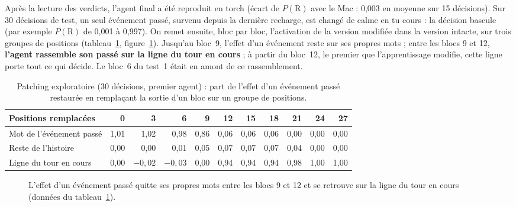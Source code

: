 \documentclass[11pt,a4paper]{article}
\begin{document}
Après la lecture des verdicts, l'agent final a été reproduit en torch (écart de
$P(\mathrm R)$ avec le Mac : 0,003 en moyenne sur 15 décisions). Sur 30 décisions
de test, un seul événement passé, survenu depuis la dernière recharge, est changé
de \og calme \fg{} en \og tu cours \fg{} : la décision bascule (par exemple
$P(\mathrm R)$ de 0,001 à 0,997). On remet ensuite, bloc par bloc, l'activation de
la version modifiée dans la version intacte, sur trois groupes de positions
(tableau~\ref{tab-patch}, figure~\ref{fig-patch}). Jusqu'au bloc~9, l'effet d'un
événement reste sur ses propres mots ; entre les blocs 9 et 12,
\textbf{l'agent rassemble son passé sur la ligne du tour en cours} ; à partir du
bloc~12, le premier que l'apprentissage modifie, cette ligne porte tout ce qui
décide. Le bloc~6 du test~1 était en amont de ce rassemblement.

\begin{table}[t]
\centering
\caption{Patching exploratoire (30 décisions, premier agent) : part de l'effet
d'un événement passé restaurée en remplaçant la sortie d'un bloc sur un groupe de
positions.}
\label{tab-patch}
\small
\setlength{\tabcolsep}{4.5pt}
\begin{tabular}{@{}l rrrrrrrrrr@{}}
\toprule
Positions remplacées & 0 & 3 & 6 & 9 & 12 & 15 & 18 & 21 & 24 & 27 \\
\midrule
Mot de l'événement passé & 1,01 & 1,02 & 0,98 & 0,86 & 0,06 & 0,06 & 0,06 & 0,00 & 0,00 & 0,00 \\
Reste de l'histoire & 0,00 & 0,00 & 0,01 & 0,05 & 0,07 & 0,07 & 0,07 & 0,04 & 0,00 & 0,00 \\
Ligne du tour en cours & 0,00 & $-0,02$ & $-0,03$ & 0,00 & 0,94 & 0,94 & 0,94 & 0,98 & 1,00 & 1,00 \\
\bottomrule
\end{tabular}
\end{table}

\begin{figure}[t]
\centering
{}
\caption{L'effet d'un événement passé quitte ses propres mots entre les blocs 9 et
12 et se retrouve sur la ligne du tour en cours (données du
tableau~\ref{tab-patch}).}
\label{fig-patch}
\end{figure}
\end{document}
